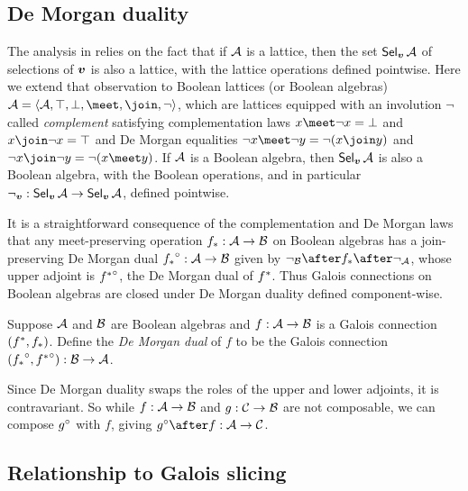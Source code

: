 \subsection{De Morgan duality}
\label{sec:toolkit:de-morgan-duality}

The analysis in  relies on the fact that if $\mathcal{A}$ is a lattice, then the set $\textup{\textsf{Sel}}_{\bm{v}}\,{\mathcal{A}}$ of selections of $\bm{v}$ is also a lattice, with the lattice operations defined pointwise. Here we extend that observation to Boolean lattices (or Boolean algebras) $\Ann{A}= \BoolLattice{\Ann{A}}{\top}{\bot}{\meet}{\join}{\neg}$, which are lattices equipped with an involution $\neg$ called \emph{complement} satisfying complementation laws $x \meet \neg x = \bot$ and $x \join \neg x = \top$ and De Morgan equalities $\neg x \meet \neg y = \neg(x \join y)$ and $\neg x \join \neg y = \neg(x \meet y)$. If $\mathcal{A}$ is a Boolean algebra, then $\textup{\textsf{Sel}}_{\bm{v}}\,{\mathcal{A}}$ is also a Boolean algebra, with the Boolean operations, and in particular $\neg_{\bm{v}}: \textup{\textsf{Sel}}_{\bm{v}}\,{\mathcal{A}} \to \textup{\textsf{Sel}}_{\bm{v}}\,{\mathcal{A}}$, defined pointwise.

It is a straightforward consequence of the complementation and De Morgan laws that any meet-preserving operation ${f}_*: \mathcal{A} \to \mathcal{B}$ on Boolean algebras has a join-preserving De Morgan dual ${{f}_*}^{\circ}: \mathcal{A} \to \mathcal{B}$ given by $\neg_{\Ann{B}} \after \upperAdj{f} \after \neg_{\Ann{A}}$, whose upper adjoint is ${{f}^*}^{\circ}$, the De Morgan dual of ${f}^*$. Thus Galois connections on Boolean algebras are closed under De Morgan duality defined component-wise.

\begin{definition}
   Suppose $\mathcal{A}$ and $\mathcal{B}$ are Boolean algebras and $f: \mathcal{A} \to \mathcal{B}$ is a Galois connection $({f}^*,{f}_*)$. Define the \emph{De Morgan dual} of $f$ to be the Galois connection $({{f}_*}^{\circ}, {{f}^*}^{\circ}): \mathcal{B} \to \mathcal{A}$.
\end{definition}

\noindent Since De Morgan duality swaps the roles of the upper and lower adjoints, it is contravariant. So while $f: \mathcal{A} \to \mathcal{B}$ and $g: \mathcal{C} \to \mathcal{B}$ are not composable, we can compose ${g}^{\circ}$ with $f$, giving $\dual{g} \after f: \Ann{A} \to \Ann{C}$.



\subsection{Relationship to Galois slicing}
\label{sec:toolkit:galois-slicing}

